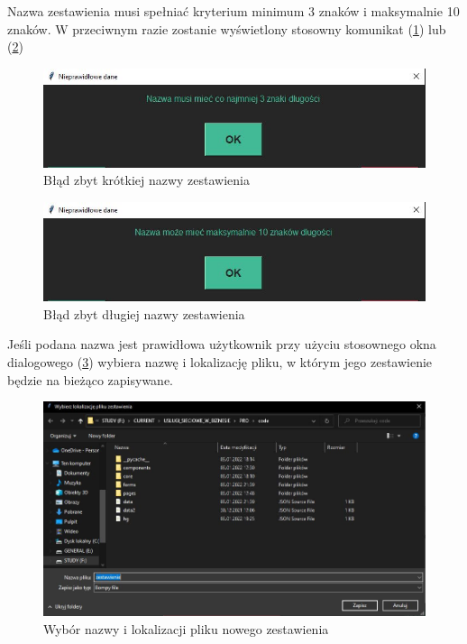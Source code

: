 \documentclass[12pt,twoside]{article}
\begin{document}
Nazwa zestawienia musi spełniać kryterium minimum 3 znaków i maksymalnie 10 znaków. W przeciwnym razie zostanie wyświetlony stosowny komunikat (\ref{fig:app:name_too_short_err}) lub (\ref{fig:app:name_too_long_err})

\begin{figure}[ht]
	\centering
	\includegraphics[width=\textwidth]{figures/app/name_too_short_err.jpg}
	\caption{Błąd zbyt krótkiej nazwy zestawienia}
\label{fig:app:name_too_short_err}
\end{figure}

\begin{figure}[ht]
	\centering
	\includegraphics[width=\textwidth]{figures/app/name_too_long_err.jpg}
	\caption{Błąd zbyt długiej nazwy zestawienia}
\label{fig:app:name_too_long_err}
\end{figure}

Jeśli podana nazwa jest prawidłowa użytkownik przy użyciu stosownego okna dialogowego (\ref{fig:app:save_file}) wybiera nazwę i lokalizację pliku, w którym jego zestawienie będzie na bieżąco zapisywane.

\begin{figure}[ht]
	\centering
	\includegraphics[width=\textwidth]{figures/app/save_file.jpg}
	\caption{Wybór nazwy i lokalizacji pliku nowego zestawienia}
\label{fig:app:save_file}
\end{figure}
\end{document}
